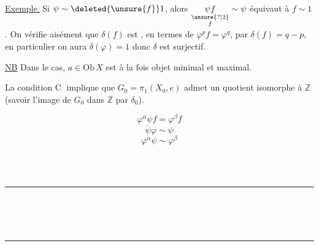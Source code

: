 \uline{Exemple.} Si $\psi\sim\deleted{\unsure{f}}1$, alors  $\underset{\substack{\unsure{?|2}\\ f}}{\psi f}\sim\psi$  équivaut à $f\sim1$ .  On vérifie aisément que $\delta(f)$ est ,  en termes de $\varphi^p f=\varphi^q$, par $\delta(f)=q-p$,  en particulier  on aura $\delta(\varphi)=1$ donc $\delta$ est surjectif. 

\uline{NB} Dans le cas, $a\in\mathrm{Ob}\,X$ est à la fois objet minimal et maximal.

La condition \textcircled{C} implique que $G_0=\pi_1(X_0,e)$ admet un quotient isomorphe à $\mathbb Z$ (savoir l'image de $G_0$ dans $\mathbb Z$ par $\delta_0$).

\[
\underline{\varphi^\alpha\psi f}=\varphi^\beta f
\]
\[
\psi\varphi\sim\psi
\]
\[
\varphi^\alpha\psi\sim\varphi^\beta
\]
\par\smallskip
{\footnotesize\noindent\begin{minipage}[t]{.46\linewidth}\raggedright
{}\\ \\ \rule{2.6em}{.3pt}\\ \\ \\ \rule{2.6em}{.3pt}\\ \\ 
\end{minipage}\hfill%
\begin{minipage}[t]{.51\linewidth}\raggedright
{}\\ \\ \\ \\ 
\end{minipage}\par}

